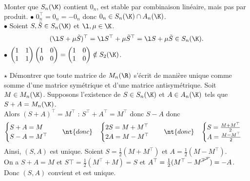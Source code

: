 \documentclass[11pt]{article}
\begin{document}
\begin{ex}{}{}
    Monter que $S_n(\K)$ contient $0_n$, est stable par combinaison linéaire, mais pas par produit.
    \tcblower
    $\bullet$ $0_n^\top=0_n=-0_n$ donc $0_n\in S_n(\K)\cap A_n(\K)$.\\
    $\bullet$ Soient $S,\tilde{S}\in S_n(\K)$ et $\l,\mu\in\K$.
    \begin{equation*}
        (\l S + \mu \tilde{S})^\top = \l S^\top + \mu\tilde{S}^\top = \l S + \mu \tilde{S} \in S_n(\K).
    \end{equation*}
    $\bullet$ $\begin{pmatrix}1&1\\1&1\end{pmatrix}\begin{pmatrix}1&0\\0&0\end{pmatrix}=\begin{pmatrix}1&0\\1&0\end{pmatrix}\notin S_2(\K)$.
\end{ex}

\begin{ex}{$\star$}{}
    Démontrer que toute matrice de $M_n(\R)$ s'écrit de manière unique comme somme d'une matrice symétrique et d'une matrice antisymétrique.
    \tcblower
    Soit $M\in M_n(\K)$. Supposons l'existence de $S\in S_n(\K)$ et $A\in A_n(\K)$ tels que $S+A=M_n(\K)$.\\
    Alors $(S+A)^\top=M^\top$ : $S^\top+A^\top=M^\top$ donc $S-A$ donc
    \begin{equation*}
        \begin{cases}
            S+A=M\\
            S-A=M^\top
        \end{cases} \quad\nt{donc}\quad \begin{cases}
            2S=M+M^\top\\
            2A=M-M^\top
        \end{cases} \quad\nt{donc}\quad \begin{cases}
            S=\frac{M+M^\top}{2}\\
            A=\frac{M-M^\top}{2}
        \end{cases}
    \end{equation*}
    Ainsi, $(S,A)$ est unique.\n
    Soient $S=\frac{1}{2}(M+M^\top)$ et $A=\frac{1}{2}(M-M^\top)$.\\
    On a $S+A=M$ et $S\top=\frac{1}{2}(M^\top+M)=S$ et $A^\top=\frac{1}{2}(M^\top-M^{\cancel{\top^\top}})=-A$.\\
    Donc $(S,A)$ convient et est unique.
\end{ex}
\end{document}
